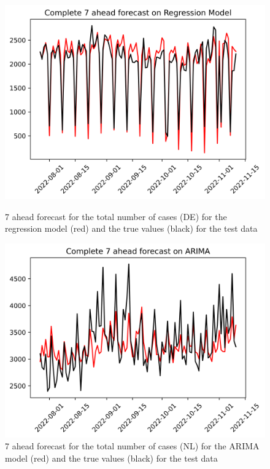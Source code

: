 \begin{figure}

\begin{minipage}{.32\textwidth}
  \centering
  \includegraphics[width=\linewidth]{pics/7_ah/DE_Complete_7_ahead_Regression Model.png}
  \caption{7 ahead forecast for the total number of cases (DE) for the regression model (red) and the true values (black) for the test data}
  \label{fig:tot_cases_fc_7_RM_DE}
\end{minipage}
\begin{minipage}{.32\textwidth}
  \centering
  \includegraphics[width=\linewidth]{pics/7_ah/Complete_7_ahead_ARIMA.png}
  \caption{7 ahead forecast for the total number of cases (NL) for the ARIMA model (red) and the true values (black) for the test data}

\end{minipage}
\end{figure}
